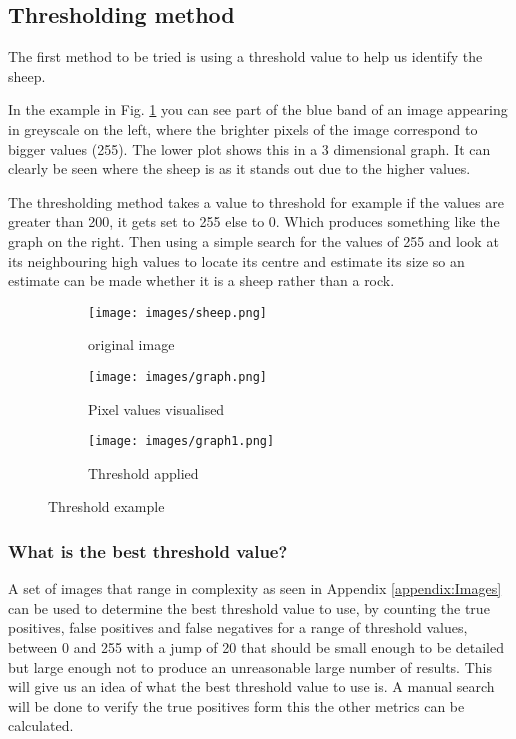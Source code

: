 \subsection{Thresholding method}

The first method to be tried is using a threshold value to help us identify the sheep\cite{opencv-python}. 
    
In the example in Fig. \ref{fig:thresh} you can see part of the blue band of an image appearing in greyscale on the left, where the brighter pixels of the image correspond to bigger values (255). The lower plot shows this in a 3 dimensional graph. It can clearly be seen where the sheep is as it stands out due to the higher values. 
    
The thresholding method takes a value to threshold for example if the values are greater than 200, it gets set to 255 else to 0. Which produces something like the graph on the right. Then using a simple search for the values of 255 and look at its neighbouring high values to locate its centre and estimate its size so an estimate can be made whether it is a sheep rather than a rock.
    
\begin{figure}[H]
    \centering
    
    \begin{subfigure}{.3\textwidth}
        \centering
        \texttt{[image: images/sheep.png]}
        \caption{original image}
    \end{subfigure}%
    \begin{subfigure}{.3\textwidth}
        \centering
        \texttt{[image: images/graph.png]}
        \caption{Pixel values visualised}
    \end{subfigure}%
    \begin{subfigure}{.3\textwidth}
        \centering
        \texttt{[image: images/graph1.png]}
        \caption{Threshold applied}
    \end{subfigure}
    \caption{Threshold example}
    \label{fig:thresh}
\end{figure}

\subsubsection{What is the best threshold value?}

A set of images that range in complexity as seen in Appendix \ref{appendix:Images} can be used to determine the best threshold value to use, by counting the true positives, false positives and false negatives for a range of threshold values, between 0 and 255 with a jump of 20 that should be small enough to be detailed but large enough not to produce an unreasonable large number of results. This will give us an idea of what the best threshold value to use is. A manual search will be done to verify the true positives form this the other metrics can be calculated.

